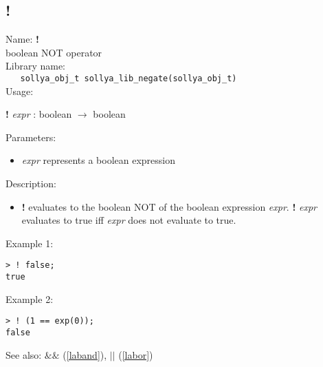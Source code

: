\subsection{!}
\label{labnot}
\noindent Name: \textbf{!}\\
\phantom{aaa}boolean NOT operator\\[0.2cm]
\noindent Library name:\\
\verb|   sollya_obj_t sollya_lib_negate(sollya_obj_t)|\\[0.2cm]
\noindent Usage: 
\begin{center}
\textbf{!} \emph{expr} : \textsf{boolean} $\rightarrow$ \textsf{boolean}\\
\end{center}
Parameters: 
\begin{itemize}
\item \emph{expr} represents a boolean expression
\end{itemize}
\noindent Description: \begin{itemize}

\item \textbf{!} evaluates to the boolean NOT of the boolean expression
   \emph{expr}. \textbf{!} \emph{expr} evaluates to true iff \emph{expr} does not evaluate
   to true.
\end{itemize}
\noindent Example 1: 
\begin{center}\begin{minipage}{15cm}\begin{Verbatim}[frame=single]
> ! false;
true
\end{Verbatim}
\end{minipage}\end{center}
\noindent Example 2: 
\begin{center}\begin{minipage}{15cm}\begin{Verbatim}[frame=single]
> ! (1 == exp(0));
false
\end{Verbatim}
\end{minipage}\end{center}
See also: \textbf{$\&\&$} (\ref{laband}), \textbf{$||$} (\ref{labor})
